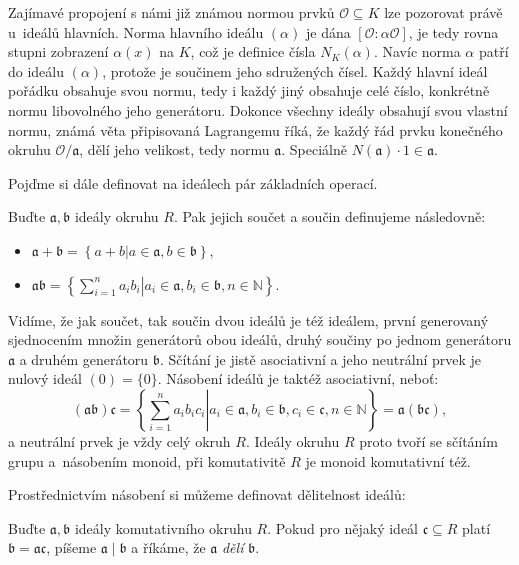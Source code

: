 \documentclass[12pt]{report}
\begin{document}
Zajímavé propojení s námi již známou normou prvků $\mathcal{O} \subseteq K$ lze pozorovat právě u~ideálů hlavních. Norma hlavního ideálu $(\alpha)$ je dána $[\mathcal{O}:\alpha \mathcal{O}]$, je tedy rovna stupni zobrazení $\alpha(x)$ na $K$, což je definice čísla $N_K(\alpha)$. Navíc norma $\alpha$ patří do ideálu $(\alpha)$, protože je součinem jeho sdružených čísel. Každý hlavní ideál pořádku obsahuje svou normu, tedy i každý jiný obsahuje celé číslo, konkrétně normu libovolného jeho generátoru. Dokonce všechny ideály obsahují svou vlastní normu, známá věta připisovaná Lagrangemu říká, že každý řád prvku konečného okruhu $\mathcal{O}/\mathfrak{a}$, dělí jeho velikost, tedy normu $\mathfrak{a}$. Speciálně $N(\mathfrak{a}) \cdot 1 \in \mathfrak{a}$.

Pojďme si dále definovat na ideálech pár základních operací.
\begin{definice}\label{soucindef}
Buďte $\mathfrak{a},\mathfrak{b}$ ideály okruhu $R$. Pak jejich součet a součin definujeme následovně:
\begin{itemize}
\item $\mathfrak{a}+\mathfrak{b}  =\left\lbrace  a+b \vert a \in \mathfrak{a}, b \in \mathfrak{b} \right\rbrace$,
\item $\mathfrak{a} \mathfrak{b} =\left\lbrace \left. \sum_{i=1}^{n} a_i b_i \right \vert a_i \in \mathfrak{a}, b_i \in \mathfrak{b}, n \in \mathbb{N} \right\rbrace$.
\end{itemize}
\end{definice}


Vidíme, že jak součet, tak součin dvou ideálů je též ideálem, první generovaný sjednocením množin generátorů obou ideálů, druhý součiny po jednom generátoru $\mathfrak{a}$ a druhém generátoru $\mathfrak{b}$. Sčítání je jistě asociativní a jeho neutrální prvek je nulový ideál $(0) = \lbrace 0 \rbrace$. Násobení ideálů je taktéž asociativní, neboť: $$(\mathfrak{a} \mathfrak{b}) \mathfrak{c}= \left\lbrace \left. \sum_{i=1}^{n} a_i b_i c_i \right\vert a_i \in \mathfrak{a}, b_i \in \mathfrak{b}, c_i \in \mathfrak{c}, n \in \mathbb{N}  \right\rbrace = \mathfrak{a}(\mathfrak{b}\mathfrak{c}),$$ a neutrální prvek je vždy celý okruh $R$. Ideály okruhu $R$ proto tvoří se sčítáním grupu a~násobením monoid, při komutativitě $R$ je monoid komutativní též.

Prostřednictvím násobení si můžeme definovat dělitelnost ideálů:
\begin{definice}
Buďte $\mathfrak{a},\mathfrak{b}$ ideály komutativního okruhu $R$. Pokud pro nějaký ideál $\mathfrak{c} \subseteq R$ platí $\mathfrak{b} = \mathfrak{a} \mathfrak{c}$, píšeme $\mathfrak{a} \mid \mathfrak{b}$ a říkáme, že $\mathfrak{a}$ \textit{dělí} $\mathfrak{b}$.
\end{definice}
\end{document}
